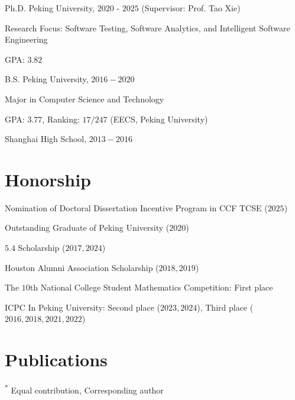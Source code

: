 \documentclass[letterpaper]{article}
\renewenvironment{itemize}{
  \begin{list}{}{
    \setlength{\leftmargin}{1.5em}
  }
}{
  \end{list}
}
\begin{document}
\begin{itemize}
  \item Ph.D. Peking University, $2020$ - $2025$ (Supervisor: Prof. Tao Xie)
  
  \begin{itemize}
      \item Research Focus: Software Testing, Software Analytics, and Intelligent Software Engineering
      \item GPA: $3.82$
  \end{itemize}

  \item B.S. Peking University, $2016-2020$
 
  \begin{itemize}
      \item Major in Computer Science and Technology
      \item GPA: $3.77$, Ranking: $17 / 247$  (EECS, Peking University)
  \end{itemize}

  \item Shanghai High School, $2013-2016$

\end{itemize}

\vspace{-0.4cm}

\section*{Honorship}
\begin{itemize}
    \item Nomination of Doctoral Dissertation Incentive Program in CCF TCSE ($2025$)
    \item Outstanding Graduate of Peking University ($2020$)
    \item $5.4$ Scholarship ($2017, 2024$)
    \item Houston Alumni Association Scholarship ($2018, 2019$)
    \item The $10$th National College Student Mathematics Competition: First place
    \item ICPC In Peking University:  Second place ($2023, 2024$), Third place ($2016, 2018, 2021, 2022$)
\end{itemize}

\section*{Publications}
\textsuperscript{*} Equal contribution, \textsuperscript{\textdagger} Corresponding author
\end{document}
